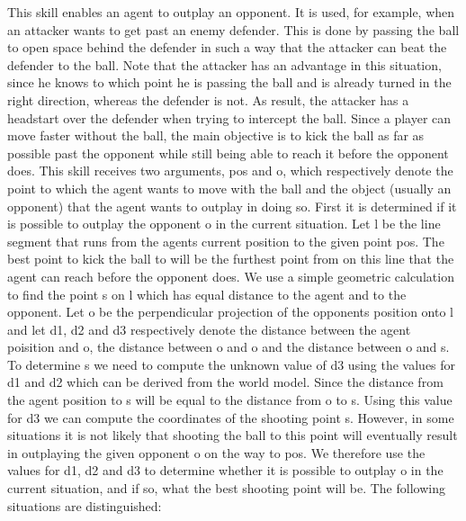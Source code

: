 This skill enables an agent to outplay an opponent. It is used, for example, when an attacker wants to get past an enemy defender. This is done by passing the ball to open space behind the defender in such a way that the attacker can beat the defender to the ball. Note that the attacker has an advantage in this situation, since he knows to which point he is passing the ball and is already turned in the right direction, whereas the defender is not. As result, the attacker has a headstart over the defender when trying to intercept the ball. Since a player can move faster without the ball, the main objective is to kick the ball as far as possible past the opponent while still being able to reach it before the opponent does. This skill receives two arguments, \textquotesingle{}pos\textquotesingle{} and \textquotesingle{}o\textquotesingle{}, which respectively denote the point to which the agent wants to move with the ball and the object (usually an opponent) that the agent wants to outplay in doing so. First it is determined if it is possible to outplay the opponent o in the current situation. Let l be the line segment that runs from the agent\textquotesingle{}s current position to the given point \textquotesingle{}pos\textquotesingle{}. The best point to kick the ball to will be the furthest point from on this line that the agent can reach before the opponent does. We use a simple geometric calculation to find the point s on l which has equal distance to the agent and to the opponent. Let o\textquotesingle{} be the perpendicular projection of the opponent\textquotesingle{}s position onto l and let d1, d2 and d3 respectively denote the distance between the agent poisition and o\textquotesingle{}, the distance between o\textquotesingle{} and o and the distance between o\textquotesingle{} and s. To determine s we need to compute the unknown value of d3 using the values for d1 and d2 which can be derived from the world model. Since the distance from the agent position to s will be equal to the distance from o to s. Using this value for d3 we can compute the coordinates of the shooting point s. However, in some situations it is not likely that shooting the ball to this point will eventually result in outplaying the given opponent o on the way to \textquotesingle{}pos\textquotesingle{}. We therefore use the values for d1, d2 and d3 to determine whether it is possible to outplay o in the current situation, and if so, what the best shooting point will be. The following situations are distinguished\+:
